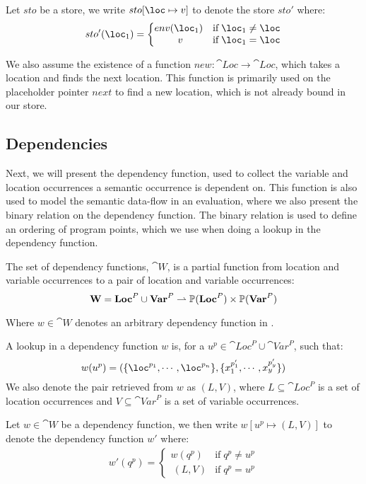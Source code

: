 \documentclass[../../master.tex]{subfiles}
\begin{document}
\begin{definition}
	Let $sto$ be a store, we write $sto[\loc\mapsto v]$ to denote the store $sto'$ where:
	\begin{align*}
		sto'(\loc_1)=
		\left\{\begin{matrix}
			env(\loc_1) & \mbox{if}\;\loc_1\neq \loc\\\	 
			v & \mbox{if}\;\loc_1=\loc
		\end{matrix}\right.
	\end{align*}
\end{definition}

We also assume the existence of a function $new:\cat{Loc}\rightarrow\cat{Loc}$, which takes a location and finds the next location.
This function is primarily used on the placeholder pointer $next$ to find a new location, which is not already bound in our store.



\subsection{Dependencies}\label{sec:DepFunc}
Next, we will present the dependency function, used to collect the variable and location occurrences a semantic occurrence is dependent on.
This function is also used to model the semantic data-flow in an evaluation, where we also present the binary relation on the dependency function.
The binary relation is used to define an ordering of program points, which we use when doing a lookup in the dependency function.

\begin{definition}\label{def:DepFunc}
	The set of dependency functions, $\cat{W}$, is a partial function from location and variable occurrences to a pair of location and variable occurrences:
	$$\textbf{W}=\textbf{Loc}^P\cup\textbf{Var}^P\rightharpoonup\mathbb{P}(\textbf{Loc}^P)\times\mathbb{P}(\textbf{Var}^P)$$
\end{definition}
Where $w\in{}$ denotes an arbitrary dependency function in \cat{W}.

A lookup in a dependency function $w$ is, for a $u^p\in\cat{Loc}^P\cup\cat{Var}^P$, such that:
$$w(u^p)=(\{\loc^{p_1},\cdots,\loc^{p_n}\},\{x_1^{p'_1},\cdots,x_y^{p'_y}\})$$
We also denote the pair retrieved from $w$ as $(L,V)$, where $L\subseteq\cat{Loc}^P$ is a set of location occurrences and $V\subseteq\cat{Var}^P$ is a set of variable occurrences.

\begin{definition}[Extension of $w$]\label{def:DepExt}
	Let $w\in\cat{W}$ be a dependency function, we then write $w[u^p\mapsto(L,V)]$ to denote the dependency function $w'$ where:
	\begin{align*}
		w'(q^p)=
		\left\{\begin{matrix}
			w(q^p) & \mbox{if}\;q^p\neq u^p\\\	 
			(L,V) & \mbox{if}\;q^p=u^p
		\end{matrix}\right.
	\end{align*}
\end{definition}
\end{document}
